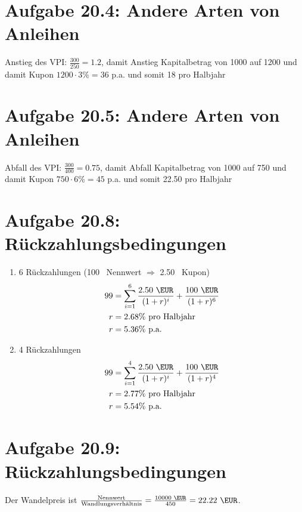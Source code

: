 \documentclass{article}
\begin{document}
	\section*{Aufgabe 20.4: Andere Arten von Anleihen}
	Anstieg des VPI: $\frac{300}{250} = 1.2$, damit Anstieg Kapitalbetrag von 1000 auf 1200 und damit Kupon $1200\cdot 3\% = 36$ p.a. und somit 18 pro Halbjahr
	
	\section*{Aufgabe 20.5: Andere Arten von Anleihen}
	Abfall des VPI: $\frac{300}{400} = 0.75$, damit Abfall Kapitalbetrag von 1000 auf 750 und damit Kupon $750\cdot 6\% = 45$ p.a. und somit 22.50 pro Halbjahr
	
	\section*{Aufgabe 20.8: Rückzahlungsbedingungen}
	\begin{enumerate}[label=(\alph*)]
		\item 6 Rückzahlungen (100 \EUR\, Nennwert $\Rightarrow$ 2.50 \EUR\, Kupon)
		\begin{align}
			99 &= \sum_{i=1}^{6} \frac{2.50\text{ \EUR}}{(1+r)^i} + \frac{100\text{ \EUR}}{(1+r)^6} \notag \\
			r &= 2.68\% \text{ pro Halbjahr} \notag \\
			r &= 5.36\% \text{ p.a.} \notag
		\end{align}
		\item 4 Rückzahlungen
		\begin{align}
			99 &= \sum_{i=1}^{4} \frac{2.50\text{ \EUR}}{(1+r)^i} + \frac{100\text{ \EUR}}{(1+r)^4} \notag \\
			r &= 2.77\% \text{ pro Halbjahr} \notag \\
			r &= 5.54\% \text{ p.a.} \notag
		\end{align}
	\end{enumerate}

	\section*{Aufgabe 20.9: Rückzahlungsbedingungen}
	Der Wandelpreis ist $\frac{\text{Nennwert}}{\text{Wandlungsverhältnis}} = \frac{10000\text{ \EUR}}{450} = 22.22\text{ \EUR}$.
	
\end{document}
